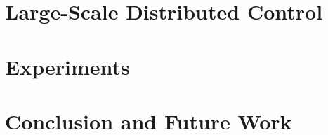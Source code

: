 \documentclass[11pt]{article}
\numberwithin{theorem}{section}
\numberwithin{equation}{section}
\begin{document}
\section{Large-Scale Distributed Control}
\label{sec:extensions}


\section{Experiments}
\label{sec:experiments}


\section{Conclusion and Future Work}
\label{sec:conclusion}


\begin{small}
  
 
\end{small} 
\end{document}
